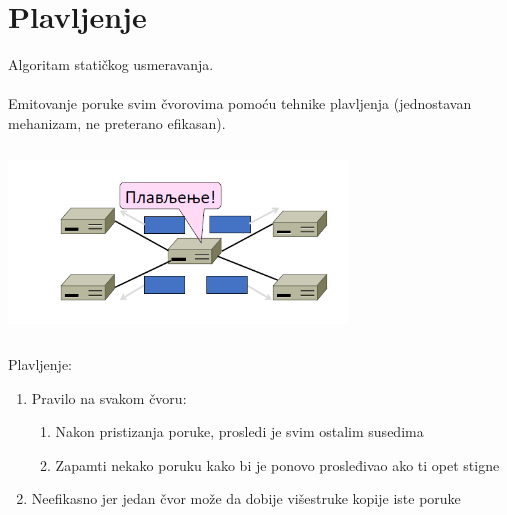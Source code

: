 \documentclass{article} %
\begin{document}
\section{Plavljenje}
Algoritam statičkog usmeravanja.\\
\\
Emitovanje poruke svim čvorovima pomoću tehnike plavljenja (jednostavan mehanizam, ne preterano efikasan).
\begin{center}
		\includegraphics[width=9cm, height=5cm]{plavljenje}\\
\end{center}
Plavljenje:
\begin{enumerate}
	\item Pravilo na svakom čvoru:
		\begin{enumerate}
			\item Nakon pristizanja poruke, prosledi je svim ostalim susedima
			\item Zapamti nekako poruku kako bi je ponovo prosleđivao ako ti opet stigne
		\end{enumerate}
	\item Neefikasno jer jedan čvor može da dobije višestruke kopije iste poruke
\end{enumerate}
\break
\end{document}
